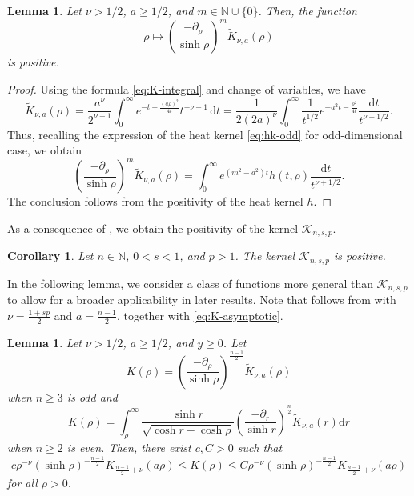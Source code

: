 \documentclass[11pt]{amsart}
\theoremstyle{plain}
\newtheorem{lemma}[theorem]{Lemma}
\newtheorem{corollary}[theorem]{Corollary}
\theoremstyle{definition}
\numberwithin{equation}{section}
\begin{document}
\begin{lemma} \label{lem:positivity}
Let $\nu > 1/2$, $a \geq 1/2$, and $m \in \mathbb{N} \cup \lbrace 0 \rbrace$. Then, the function
\begin{equation*}
\rho \mapsto \left( \frac{-\partial_{\rho}}{\sinh \rho} \right)^{m} \widetilde{K}_{\nu,a}(\rho)
\end{equation*}
is positive.
\end{lemma}

\begin{proof}
Using the formula \eqref{eq:K-integral} and change of variables, we have
\begin{equation*}
\widetilde{K}_{\nu,a}(\rho) = \frac{a^{\nu}}{2^{\nu+1}} \int_{0}^{\infty} e^{-t-\frac{(a\rho)^2}{4t}} t^{-\nu-1} \,\mathrm{d}t = \frac{1}{2(2a)^{\nu}} \int_{0}^{\infty} \frac{1}{t^{1/2}} e^{-a^{2}t-\frac{\rho^{2}}{4t}} \frac{\mathrm{d}t}{t^{\nu+1/2}}.
\end{equation*}
Thus, recalling the expression of the heat kernel \eqref{eq:hk-odd} for odd-dimensional case, we obtain
\begin{equation*}
\left( \frac{-\partial_{\rho}}{\sinh \rho} \right)^{m} \widetilde{K}_{\nu,a}(\rho) = \int_{0}^{\infty} e^{(m^{2}-a^{2})t} h(t, \rho) \frac{\mathrm{d}t}{t^{\nu+1/2}}.
\end{equation*}
The conclusion follows from the positivity of the heat kernel $h$.
\end{proof}

As a consequence of , we obtain the positivity of the kernel $\mathcal{K}_{n,s,p}$.

\begin{corollary} \label{cor:nonnegativity}
Let $n \in \mathbb{N}$, $0<s<1$, and $p > 1$. The kernel $\mathcal{K}_{n,s,p}$ is positive.
\end{corollary}

In the following lemma, we consider a class of functions more general than $\mathcal{K}_{n, s, p}$ to allow for a broader applicability in later results. Note that  follows from  with $\nu=\frac{1+sp}{2}$ and $a=\frac{n-1}{2}$, together with \eqref{eq:K-asymptotic}.

\begin{lemma}\label{lem-asymptotic}
Let $\nu>1/2$, $a \geq 1/2$, and $y \geq 0$. Let
\begin{equation*}
K(\rho) = \left( \frac{-\partial_\rho}{\sinh \rho} \right)^{\frac{n-1}{2}} \widetilde{K}_{\nu,a}(\rho)
\end{equation*}
when $n \geq 3$ is odd and
\begin{equation*}
K(\rho) = \int_{\rho}^{\infty} \frac{\sinh r}{\sqrt{\cosh r - \cosh \rho}} \left( \frac{-\partial_r}{\sinh r} \right)^{\frac{n}{2}} \widetilde{K}_{\nu,a}(r) \mathrm{d}r
\end{equation*}
when $n \geq 2$ is even. Then, there exist $c, C>0$ such that
\begin{equation*}
c\rho^{-\nu} (\sinh\rho)^{-\frac{n-1}{2}} K_{\frac{n-1}{2}+\nu}(a\rho) \leq K(\rho) \leq C\rho^{-\nu} (\sinh\rho)^{-\frac{n-1}{2}} K_{\frac{n-1}{2}+\nu}(a\rho)
\end{equation*}
for all $\rho > 0$.
\end{lemma}
\end{document}
